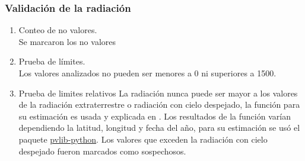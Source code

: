 \documentclass[11pt]{article}
\begin{document}

\subsubsection{Validación de la radiación}

\begin{enumerate}
\item Conteo de no valores.\\
Se marcaron los no valores

\item Prueba de límites.\\
Los valores analizados no pueden ser menores a 0 ni superiores a 1500.

\item Prueba de limites relativos
La radiación nunca puede ser mayor a los valores de la radiación extraterrestre o radiación con cielo despejado, la función para su estimación es usada y explicada en  \citet{Allen1994}. Los resultados de la función varían dependiendo la latitud, longitud y fecha del año, para su estimación se usó el paquete \textcolor{blue}{ \href{http://pvlib-python.readthedocs.io/en/latest/index.html}{pvlib-python}}. Los valores que exceden la radiación con cielo despejado fueron marcados como sospechosos.


\end{enumerate}
\end{document}
